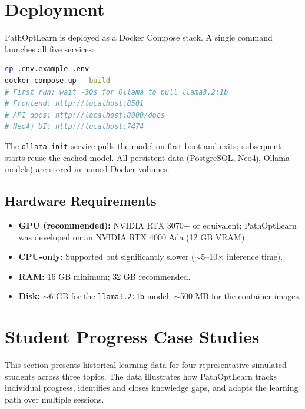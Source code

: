 \documentclass[12pt,a4paper]{article}
\begin{document}
\section{Deployment}

PathOptLearn is deployed as a Docker Compose stack. A single command
launches all five services:

\begin{lstlisting}[language=bash, caption={Deploying PathOptLearn.}]
cp .env.example .env
docker compose up --build
# First run: wait ~30s for Ollama to pull llama3.2:1b
# Frontend: http://localhost:8501
# API docs: http://localhost:8000/docs
# Neo4j UI: http://localhost:7474
\end{lstlisting}

The \texttt{ollama-init} service pulls the model on first boot and exits;
subsequent starts reuse the cached model. All persistent data (PostgreSQL,
Neo4j, Ollama models) are stored in named Docker volumes.

\subsection{Hardware Requirements}

\begin{itemize}
  \item \textbf{GPU (recommended):} NVIDIA RTX 3070+ or equivalent;
    PathOptLearn was developed on an NVIDIA RTX 4000 Ada (12 GB VRAM).
  \item \textbf{CPU-only:} Supported but significantly slower
    ($\sim$5--10$\times$ inference time).
  \item \textbf{RAM:} 16 GB minimum; 32 GB recommended.
  \item \textbf{Disk:} $\sim$6 GB for the \texttt{llama3.2:1b} model;
    $\sim$500 MB for the container images.
\end{itemize}

\section{Student Progress Case Studies}

This section presents historical learning data for four representative
simulated students across three topics. The data illustrates how PathOptLearn
tracks individual progress, identifies and closes knowledge gaps, and adapts
the learning path over multiple sessions.
\end{document}
